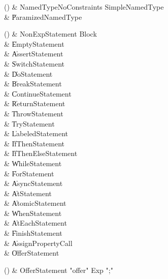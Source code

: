 \begin{bbgrammarappendix}

() & NamedTypeNoConstraints \label{prod:NamedTypeNoConstraints}  \: SimpleNamedType  \\

 &    \| ParamizedNamedType \\

\end{bbgrammarappendix}

\begin{bbgrammarappendix}

() & NonExpStatement \label{prod:NonExpStatement}  \: Block  \\

 &    \| EmptyStatement \\
 &    \| AssertStatement \\
 &    \| SwitchStatement \\
 &    \| DoStatement \\
 &    \| BreakStatement \\
 &    \| ContinueStatement \\
 &    \| ReturnStatement \\
 &    \| ThrowStatement \\
 &    \| TryStatement \\
 &    \| LabeledStatement \\
 &    \| IfThenStatement \\
 &    \| IfThenElseStatement \\
 &    \| WhileStatement \\
 &    \| ForStatement \\
 &    \| AsyncStatement \\
 &    \| AtStatement \\
 &    \| AtomicStatement \\
 &    \| WhenStatement \\
 &    \| AtEachStatement \\
 &    \| FinishStatement \\
 &    \| AssignPropertyCall \\
 &    \| OfferStatement \\

\end{bbgrammarappendix}

\begin{bbgrammarappendix}

() & OfferStatement \label{prod:OfferStatement}  \: \xcd"offer" Exp \xcd";"  \\


\end{bbgrammarappendix}

